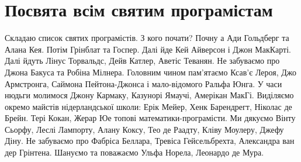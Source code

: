 \section{Посвята всім святим програмістам}

Складаю список святих програмістів. З кого почати? Почну а
Ади Гольдберг та Алана Кея. Потім Грінблат та Госпер.
Далі йде Кей Айверсон і Джон МакКарті.
Далі йдуть Лінус Торвальдс, Дейв Катлер, Аветіс Теванян.
Не забуваємо про Джона Бакуса та Робіна Мілнера.
Головним чином пам'ятаємо Ксав'є Лероя, Джо Армстронга,
Саймона Пейтона-Джонса і мало-відомого Ральфа Юнга.
У часи нюдьги молимося Джону Кармаку, Казунорі Ямаучі, Амерікан МакГі.
Виділяємо окремо майстів нідерландської школи: Ерік Мейер,
Хенк Барендрегт, Ніколас де Брейн.
Тері Кокан, Жерар Юе топові математики-програмісти.
Ми дякуємо Вінту Сьорфу, Леслі Лампорту, Алану Коксу,
Тео де Раадту, Кліву Моулеру, Джефу Діну.
Не забуваємо про Фабріса Беллара, Тревіса Гейсельбрехта,
Александра ван дер Грінтена.
Шануємо та поважаємо Ульфа Норела, Леонардо де Мура.

\normalsize
